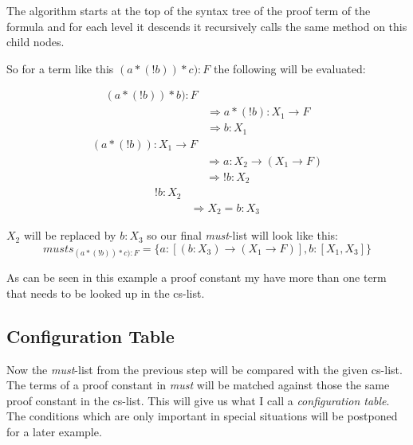The algorithm starts at the top of the syntax tree of the proof term of the formula and for each level it descends it recursively calls the same method on this child nodes.

So for a term like this $(a*(!b))*c):F$ the following will be evaluated:

\begin{equation}\label{musts}
\begin{split}
	(a*(!b))*b):F \\
	& \Rightarrow a*(!b):  X_1 \rightarrow F \\
	& \Rightarrow b:  X_1
\end{split}
\end{equation}
\begin{equation}\label{musts1}
\begin{split}
	(a*(!b)): X_1 \rightarrow F \\
	& \Rightarrow a: X_2 \rightarrow (X_1 \rightarrow F)\\
	& \Rightarrow !b: X_2
\end{split}
\end{equation}
\begin{equation}\label{musts2}
\begin{split}
	!b: X_2 \\
	& \Rightarrow X_2 = b:X_3
\end{split}
\end{equation}

$X_2$ will be replaced by $b:X_3$ so our final \emph{must}-list will look like this: 
\begin{equation}\label{must-list}
musts_{(a*(!b))*c):F} = \{a: [(b:X_3) \rightarrow (X_1 \rightarrow F)], b: [X_1, X_3] \}
\end{equation}

As can be seen in this example a proof constant my have more than one term that needs to be looked up in the cs-list.

\subsection{Configuration Table}
Now the \emph{must}-list from the previous step will be compared with the given cs-list. The terms of a proof constant in \emph{must} will be matched against those the same proof constant in the cs-list. This will give us what I call a \emph{configuration table}. The conditions which are only important in special situations will be postponed for a later example.

